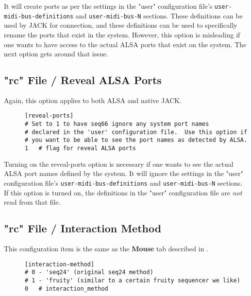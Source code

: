    It will create ports as per the settings in the "user" configuration file's
   \texttt{user-midi-bus-definitions} and \texttt{user-midi-bus-N} sections.
   These definitions can be used by JACK for connection, and these definitions
   can be used to specifically rename the ports that exist in the system.
   However, this option is misleading if one wants to have access to the
   actual ALSA ports that exist on the system.
   The next option gets around that issue.

\subsection{"rc" File / Reveal ALSA Ports}
\label{subsec:rc_file_reveal_ports}

   Again, this option applies to both ALSA and native JACK.

   \begin{verbatim}
      [reveal-ports]
      # Set to 1 to have seq66 ignore any system port names
      # declared in the 'user' configuration file.  Use this option if
      # you want to be able to see the port names as detected by ALSA.
      1   # flag for reveal ALSA ports
   \end{verbatim}

   Turning on the reveal-ports option is necessary if one
   wants to see the actual ALSA port names defined by the system.
   It will ignore the settings in the "user" configuration file's
   \texttt{user-midi-bus-definitions} and \texttt{user-midi-bus-N} sections.
   If this option is turned on, the definitions in the
   "user" configuration file are \textsl{not} read from that file.

\subsection{"rc" File / Interaction Method}
\label{subsec:rc_file_interaction}

   This configuration item is the same as the 
   \textbf{Mouse} tab described in
   .

   \begin{verbatim}
      [interaction-method]
      # 0 - 'seq24' (original seq24 method)
      # 1 - 'fruity' (similar to a certain fruity sequencer we like)
      0   # interaction_method
   \end{verbatim}

